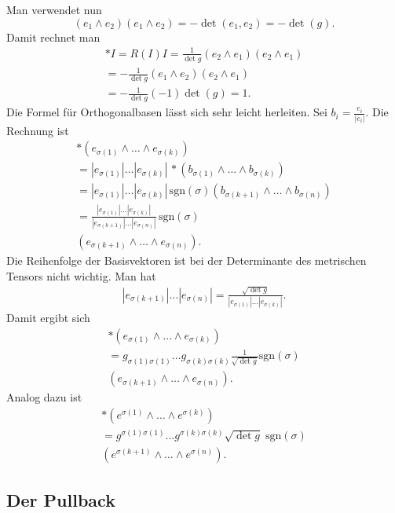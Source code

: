 \documentclass[a4paper,10pt,fleqn,twocolumn,twoside]{article}
\begin{document}
Man verwendet nun
\[(e_1\wedge e_2)(e_1\wedge e_2) = -\det(e_1,e_2) = -\det(g).\]
Damit rechnet man
\begin{gather*}
*I = R(I)I = \frac{1}{\det g}(e_2\wedge e_1)(e_2\wedge e_1)\\
= -\frac{1}{\det g}(e_1\wedge e_2)(e_2\wedge e_1)\\
= -\frac{1}{\det g}(-1)\det(g) = 1.
\end{gather*}
%
Die Formel für Orthogonalbasen lässt sich sehr leicht herleiten.
Sei \(b_i=\frac{e_i}{|e_i|}\). Die Rechnung ist
\begin{gather*}
*(e_{\sigma(1)}\wedge\ldots\wedge e_{\sigma(k)})\\
= |e_{\sigma(1)}|\ldots|e_{\sigma(k)}|\,
{*}(b_{\sigma(1)}\wedge\ldots\wedge b_{\sigma(k)})\\
= |e_{\sigma(1)}|\ldots|e_{\sigma(k)}|\,
\mathrm{sgn}(\sigma)(b_{\sigma(k+1)}
\wedge\ldots\wedge b_{\sigma(n)})\\
= \frac{|e_{\sigma(1)}|\ldots|e_{\sigma(k)}|}
{|e_{\sigma(k+1)}|\ldots|e_{\sigma(n)}|}\,
\mathrm{sgn}(\sigma)\\
(e_{\sigma(k+1)} \wedge\ldots\wedge e_{\sigma(n)}).
\end{gather*}
Die Reihenfolge der Basisvektoren ist bei der Determinante
des metrischen Tensors nicht wichtig. Man hat
\begin{gather*}
|e_{\sigma(k+1)}|\ldots|e_{\sigma(n)}|
= \frac{\sqrt{\det g}}{|e_{\sigma(1)}|\ldots|e_{\sigma(k)}|}.
\end{gather*}
Damit ergibt sich
\begin{gather*}
*(e_{\sigma(1)}\wedge\ldots\wedge e_{\sigma(k)})\\
= g_{\sigma(1)\sigma(1)}\ldots g_{\sigma(k)\sigma(k)}
\frac{1}{\sqrt{\det g}} \mathrm{sgn}(\sigma)\\
(e_{\sigma(k+1)} \wedge\ldots\wedge e_{\sigma(n)}).
\end{gather*}
Analog dazu ist
\begin{gather*}
*(e^{\sigma(1)}\wedge\ldots\wedge e^{\sigma(k)})\\
= g^{\sigma(1)\sigma(1)}\ldots g^{\sigma(k)\sigma(k)}
\sqrt{\det g}\;\mathrm{sgn}(\sigma)\\
(e^{\sigma(k+1)} \wedge\ldots\wedge e^{\sigma(n)}).
\end{gather*}

\subsection{Der Pullback}
\end{document}
